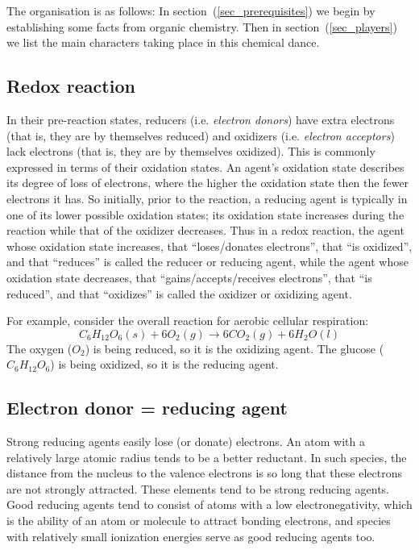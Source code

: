 \documentclass{article}
\begin{document}
The organisation is as follows: In section~(\ref{sec_prerequisites}) we begin by
establishing some facts from organic chemistry. Then in section~(\ref{sec_players})
we list the main characters taking place in this chemical dance.

\subsection{Redox reaction}
In their pre-reaction states, reducers (i.e. {\em electron donors\/}) have extra electrons
(that is, they are by themselves reduced) and oxidizers (i.e. {\em electron acceptors\/})
lack electrons (that is, they are by themselves oxidized). This is commonly expressed in
terms of their oxidation states. An agent's oxidation state describes its degree of loss
of electrons, where the higher the oxidation state then the fewer electrons it has. So
initially, prior to the reaction, a reducing agent is typically in one of its lower
possible oxidation states; its oxidation state increases during the reaction while that of
the oxidizer decreases. Thus in a redox reaction, the agent whose oxidation state
increases, that ``loses/donates electrons'', that ``is oxidized'', and that ``reduces'' is
called the reducer or reducing agent, while the agent whose oxidation state decreases,
that ``gains/accepts/receives electrons'', that ``is reduced'', and that ``oxidizes'' is
called the oxidizer or oxidizing agent.

For example, consider the overall reaction for aerobic cellular respiration:
\[
    C_6H_{12}O_6(s) + 6O_2(g) \rightarrow 6CO_2(g) + 6H_2O(l)
\]
The oxygen ($O_2$) is being reduced, so it is the oxidizing agent. The glucose
($C_6H_{12}O_6$) is being oxidized, so it is the reducing agent.

\subsection{Electron donor = reducing agent}

Strong reducing agents easily lose (or donate) electrons. An atom with a relatively large
atomic radius tends to be a better reductant. In such species, the distance from the
nucleus to the valence electrons is so long that these electrons are not strongly
attracted. These elements tend to be strong reducing agents. Good reducing agents tend to
consist of atoms with a low electronegativity, which is the ability of an atom or molecule
to attract bonding electrons, and species with relatively small ionization energies serve
as good reducing agents too.
\end{document}
